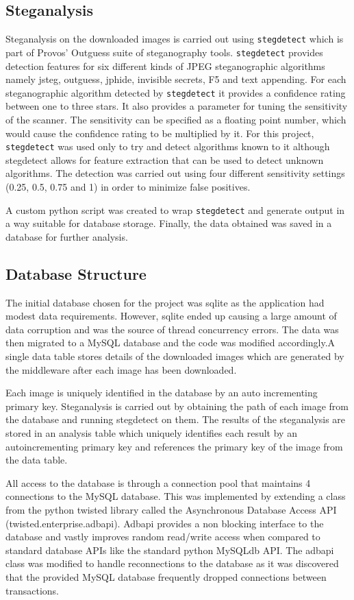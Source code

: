 \subsection {Steganalysis}
\label{sec:stegtool}
Steganalysis on the downloaded images is carried out using \texttt{stegdetect} which is part of Provos' Outguess suite of steganography tools. \texttt{stegdetect} provides detection features for six different kinds of JPEG steganographic algorithms namely jsteg, outguess, jphide, invisible secrets, F5 and text appending. For each steganographic algorithm detected by \texttt{stegdetect} it provides a confidence rating between one to three stars. It also provides a parameter for tuning the sensitivity of the scanner. The sensitivity can be specified as a floating point number, which would cause the confidence rating to be multiplied by it. For this project, \texttt{stegdetect} was used only to try and detect algorithms known to it although stegdetect allows for feature extraction that can be used to detect unknown algorithms. The detection was carried out using four different sensitivity settings (0.25, 0.5, 0.75 and 1) in order to minimize false positives.
\par A custom python script was created to wrap \texttt{stegdetect} and generate output in a way suitable for database storage. Finally, the data obtained was saved in a database for further analysis.
\subsection{Database Structure}
\label{sec:dbstructure}
The initial database chosen for the project was sqlite as the application had modest data requirements. However, sqlite ended up causing a large amount of data corruption and was the source of thread concurrency errors. The data was then migrated to a MySQL database and the code was modified accordingly.A single data table stores details of the downloaded images which are generated by the middleware after each image has been downloaded. 
\par Each image is uniquely identified in the database by an auto incrementing primary key. Steganalysis is carried out by obtaining the path of each image from the database and running stegdetect on them. The results of the steganalysis are stored in an analysis table which uniquely identifies each result by an autoincrementing primary key and references the primary key of the image from the data table.
\par  All access to the database is through a connection pool that maintains 4 connections to the MySQL database. This was implemented by extending a class from the python twisted library called the Asynchronous Database Access API (twisted.enterprise.adbapi). Adbapi provides a non blocking interface to the database and vastly improves random read/write access when compared to standard database APIs like the standard python MySQLdb API. The adbapi class was modified to handle reconnections to the database as it was discovered that the provided MySQL database frequently dropped connections between transactions. 
